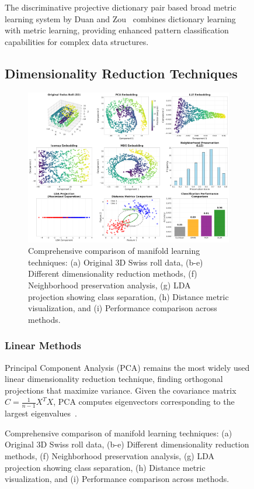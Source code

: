 \documentclass[review]{elsarticle}
\begin{document}
\begin{figure}[htbp]
The discriminative projective dictionary pair based broad metric learning system by Duan and Zou~\cite{duan2025discriminative} combines dictionary learning with metric learning, providing enhanced pattern classification capabilities for complex data structures.

\subsection{Dimensionality Reduction Techniques}

\begin{figure}[htbp]
\centering
\includegraphics[width=\textwidth]{manifold_learning_comparison.pdf}
\caption{Comprehensive comparison of manifold learning techniques: (a) Original 3D Swiss roll data, (b-e) Different dimensionality reduction methods, (f) Neighborhood preservation analysis, (g) LDA projection showing class separation, (h) Distance metric visualization, and (i) Performance comparison across methods.}
\label{fig:manifold_comparison}
\end{figure}

\subsubsection{Linear Methods}

Principal Component Analysis (PCA) remains the most widely used linear dimensionality reduction technique, finding orthogonal projections that maximize variance. Given the covariance matrix $C = \frac{1}{n-1}X^TX$, PCA computes eigenvectors corresponding to the largest eigenvalues~\cite{jolliffe2002principal}.


\end{figure}
\end{document}
